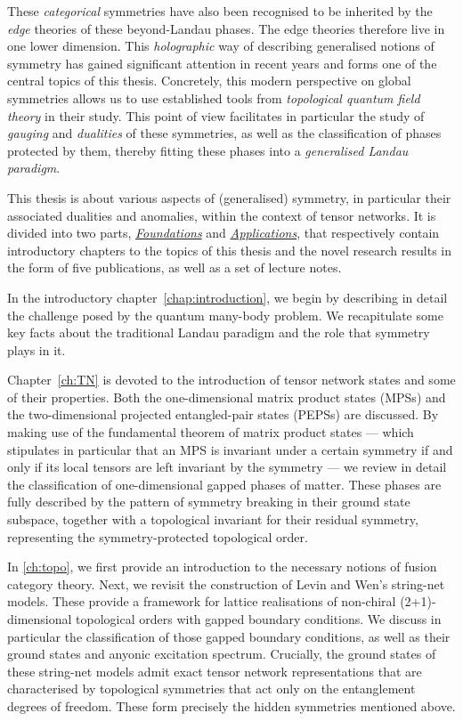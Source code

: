 These \emph{categorical} symmetries have also been recognised to be inherited by the \emph{edge} theories of these beyond-Landau phases. The edge theories therefore live in one lower dimension. This \emph{holographic} way of describing generalised notions of symmetry has gained significant attention in recent years and forms one of the central topics of this thesis. Concretely, this modern perspective on global symmetries allows us to use established tools from \emph{topological quantum field theory} in their study. This point of view facilitates in particular the study of \emph{gauging} and \emph{dualities} of these symmetries, as well as the classification of phases protected by them, thereby fitting these phases into a \emph{generalised Landau paradigm}.

\bigskip\noindent This thesis is about various aspects of (generalised) symmetry, in particular their associated dualities and anomalies, within the context of tensor networks. It is divided into two parts, \hyperref[part:Foundations]{\emph{Foundations}} and \hyperref[part:Applications]{\emph{Applications}}, that respectively contain introductory chapters to the topics of this thesis and the novel research results in the form of five publications, as well as a set of lecture notes.

In the introductory chapter~\ref{chap:introduction}, we begin by describing in detail the challenge posed by the quantum many-body problem. We recapitulate some key facts about the traditional Landau paradigm and the role that symmetry plays in it.

Chapter~\ref{ch:TN} is devoted to the introduction of tensor network states and some of their properties. Both the one-dimensional matrix product states (MPSs) and the two-dimensional projected entangled-pair states (PEPSs) are discussed. By making use of the fundamental theorem of matrix product states --- which stipulates in particular that an MPS is invariant under a certain symmetry if and only if its local tensors are left invariant by the symmetry --- we review in detail the classification of one-dimensional gapped phases of matter. These phases are fully described by the pattern of symmetry breaking in their ground state subspace, together with a topological invariant for their residual symmetry, representing the symmetry-protected topological order.

In \cref{ch:topo}, we first provide an introduction to the necessary notions of fusion category theory. Next, we revisit the construction of Levin and Wen's string-net models. These provide a framework for lattice realisations of non-chiral (2+1)-dimensional topological orders with gapped boundary conditions. We discuss in particular the classification of those gapped boundary conditions, as well as their ground states and anyonic excitation spectrum. Crucially, the ground states of these string-net models admit exact tensor network representations that are characterised by topological symmetries that act only on the entanglement degrees of freedom. These form precisely the hidden symmetries mentioned above.

